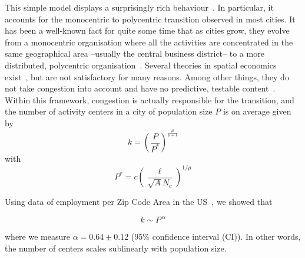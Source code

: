 This simple model displays a surprisingly rich behaviour~\cite{Louf:2013}. In particular, it accounts for the monocentric to polycentric transition observed in most cities. It has been a well-known fact for quite some time that as cities grow, they evolve from a monocentric organisation where all the activities are concentrated in the same geographical area --usually the central business district-- to a more distributed, polycentric organisation~\cite{Fujita:1982,McMillen:2003}. Several theories in spatial economics exist~\cite{Fujita:1999}, but are not satisfactory for many reasons. Among other things, they do not take congestion into account and have no predictive, testable content~\cite{Bouchaud:2008}. Within this framework, congestion is actually responsible for the transition, and the number of activity centers in a city of population size $P$ is on average given by
%
\begin{equation}
k = \left( \frac{P}{P^*} \right)^{\frac{\mu}{\mu+1}}
\label{eq:num_centers}
\end{equation}  
with 
\begin{equation}
P^* = c \left( \frac{\ell}{\sqrt{A} N_c} \right)^{1/\mu}
\end{equation}



Using data of employment per Zip Code Area in the US~\cite{Louf:2013}, we showed that

\begin{equation}
k \sim P^{\,\alpha}
\end{equation}

where we measure $\alpha = 0.64 \pm 0.12$ ($95\%$ confidence interval (CI)). In other words, the number of centers scales sublinearly with population size. 


